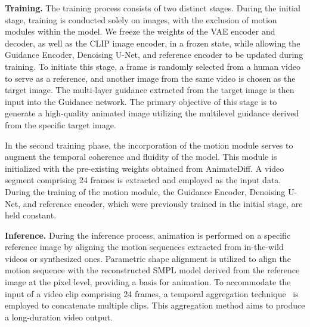 \textbf{Training.}
The training process consists of two distinct stages.
During the initial stage, training is conducted solely on images, with the exclusion of motion modules within the model. 
We freeze the weights of the VAE encoder and decoder, as well as the CLIP image encoder, in a frozen state, while allowing the Guidance Encoder, Denoising U-Net, and reference encoder to be updated during training.
To initiate this stage, a frame is randomly selected from a human video to serve as a reference, and another image from the same video is chosen as the target image. 
The multi-layer guidance extracted from the target image is then input into the Guidance network. 
The primary objective of this stage is to generate a high-quality animated image utilizing the multilevel guidance derived from the specific target image.

In the second training phase, the incorporation of the motion module serves to augment the temporal coherence and fluidity of the model.
This module is initialized with the pre-existing weights obtained from AnimateDiff. 
A video segment comprising 24 frames is extracted and employed as the input data. 
During the training of the motion module, the Guidance Encoder, Denoising U-Net, and reference encoder, which were previously trained in the initial stage, are held constant.

\textbf{Inference.}
During the inference process, animation is performed on a specific reference image by aligning the motion sequences extracted from in-the-wild videos or synthesized ones.
Parametric shape alignment is utilized to align the motion sequence with the reconstructed SMPL model derived from the reference image at the pixel level, providing a basis for animation. 
To accommodate the input of a video clip comprising 24 frames, a temporal aggregation technique~\cite{tseng2022edge} is employed to concatenate multiple clips. This aggregation method aims to produce a long-duration video output.